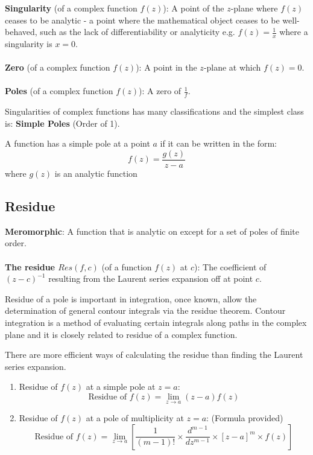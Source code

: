 \documentclass[10pt,a4paper]{article}
\begin{document}
\begin{tcolorbox}[breakable,colback=white]
\textbf{Singularity} (of a complex function $f(z)$): A point of the $z$-plane where $f(z)$ ceases to
be analytic - a point where the mathematical object ceases to be
well-behaved, such as the lack of differentiability or analyticity e.g.
$f(z)=\frac{1}{x}$ where a singularity is $x=0$. 
\\
\\
\textbf{Zero} (of a complex function $f(z)$): A point in the $z$-plane at which $f(z) = 0$.
\\
\\
\textbf{Poles} (of a complex function $f(z)$): A zero of $\frac{1}{f}$. 
\end{tcolorbox}

Singularities of complex functions has many classifications and the simplest class is: \textbf{Simple Poles}
(Order of 1). \par

A function has a simple pole at a point $a$ if it can be written in the form: 
$$
f(z)=\frac{g(z)}{z-a}
$$
where $g(z)$ is an analytic function

\subsection{Residue} 

\begin{tcolorbox}[breakable,colback=white]
\textbf{Meromorphic}: A function that is analytic on except for a set of poles of finite order.
\\
\\
\textbf{The residue $Res(f,c)$} (of a function $f(z)$ at $c$): The coefficient of $(z-c)^{-1}$
resulting from the Laurent series expansion off at point $c$.
\end{tcolorbox}

Residue of a pole is important in integration, once known, allow the determination of general
contour integrals via the residue theorem. Contour integration is a method of evaluating certain
integrals along paths in the complex plane and it is closely related to residue of a complex function. 

There are more efficient ways of calculating the residue than finding the Laurent series expansion.
\begin{enumerate}
    \item Residue of $f(z)$ at a simple pole at $z=a$:
    $$
        \text{Residue of }f(z) = \lim_{z\rightarrow a}{(z-a)f(z)}
    $$
    \item Residue of $f(z)$ at a pole of multiplicity at $z=a$: (Formula provided)
    $$
        \text{Residue of }f(z) = \lim_{z\rightarrow a}\left[\frac{1}{(m-1)!}\times \frac{d^{m-1}}{dz^{m-1}} \times [z-a]^m \times f(z)\right]
    $$
\end{enumerate}
\end{document}
